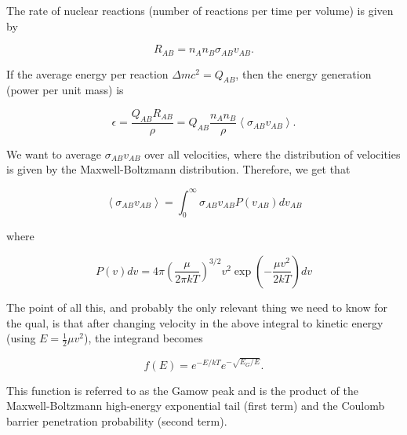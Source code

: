 The rate of nuclear reactions (number of reactions per time per volume) is given by 

\begin{equation}
R_{AB} = n_{A} n_{B} \sigma_{AB} v_{AB}.
\end{equation}

If the average energy per reaction $\Delta mc^2 = Q_{AB}$, then the energy generation (power per unit mass) is 

\begin{equation}\label{engen}
\epsilon = \frac{Q_{AB} R_{AB}}{\rho} = Q_{AB} \frac{n_{A} n_{B}}{\rho} \left<\sigma_{AB} v_{AB}\right>.
\end{equation}

We want to average $\sigma_{AB} v_{AB}$ over all velocities, where the distribution of velocities is given by the Maxwell-Boltzmann distribution.  Therefore, we get that

\begin{equation}
\left< \sigma_{AB} v_{AB} \right> = \int_0^{\infty} \sigma_{AB} v_{AB} P(v_{AB}) dv_{AB}
\end{equation}

where

\begin{equation}
P(v)dv = 4 \pi \left( \frac{\mu}{2 \pi kT} \right)^{3/2} v^2 \exp\left(- \frac{\mu v^2}{2kT}\right) dv
\end{equation}

The point of all this, and probably the only relevant thing we need to know for the qual, is that after changing velocity in the above integral to kinetic energy (using $E = \frac{1}{2} \mu v^2$), the integrand becomes

\begin{equation}\label{gamp}
f(E) = e^{-E/kT} e^{-\sqrt{E_{G}/E}}.
\end{equation}

This function is referred to as the Gamow peak and is the product of the Maxwell-Boltzmann high-energy exponential tail (first term) and the Coulomb barrier penetration probability (second term).

